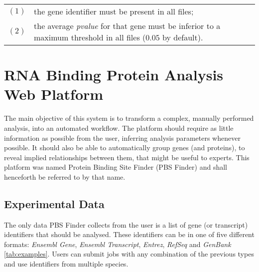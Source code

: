 \begin{table}[H]
  \begin{tabular}{l p{}}
    $(1)$ & the gene identifier must be present in all files;\\
    $(2)$ & the average \emph{pvalue} for that gene must be inferior to a
    maximum threshold in all files ($0.05$ by default).\\
  \end{tabular}
\end{table}

\section{RNA Binding Protein Analysis Web Platform}


The main objective of this system is to transform a complex, manually performed
analysis, into an automated workflow. The platform should require as little
information as possible from the user, inferring analysis parameters whenever
possible. It should also be able to automatically group genes (and proteins), to
reveal implied relationships between them, that might be useful to experts. This
platform was named Protein Binding Site Finder (PBS Finder) and shall henceforth
be referred to by that name.

\subsection{Experimental Data}

The only data PBS Finder collects from the user is a list of gene (or
transcript) identifiers that should be analysed. These identifiers can be in one
of five different formats: \emph{Ensembl Gene}, \emph{Ensembl Transcript},
\emph{Entrez}, \emph{RefSeq} and \emph{GenBank} \ref{tab:examples}. Users can
submit jobs with any combination of the previous types and use identifiers from
multiple species.


